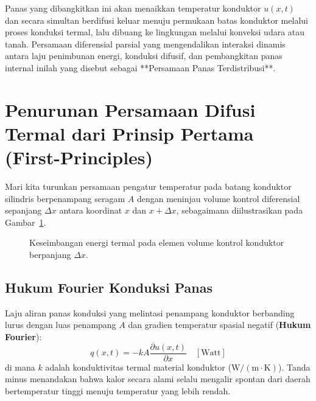 \documentclass[11pt,a4paper]{article}
\theoremstyle{definition}
\begin{document}
Panas yang dibangkitkan ini akan menaikkan temperatur konduktor $u(x, t)$ dan secara simultan berdifusi keluar menuju permukaan batas konduktor melalui proses konduksi termal, lalu dibuang ke lingkungan melalui konveksi udara atau tanah. Persamaan diferensial parsial yang mengendalikan interaksi dinamis antara laju penimbunan energi, konduksi difusif, dan pembangkitan panas internal inilah yang disebut sebagai **Persamaan Panas Terdistribusi**.

\section{Penurunan Persamaan Difusi Termal dari Prinsip Pertama (First-Principles)}

Mari kita turunkan persamaan pengatur temperatur pada batang konduktor silindris berpenampang seragam $A$ dengan meninjau volume kontrol diferensial sepanjang $\Delta x$ antara koordinat $x$ dan $x + \Delta x$, sebagaimana diilustrasikan pada Gambar~\ref{fig:heat_control_volume}.

\begin{figure}[htbp]
\centering
{}
\caption{Keseimbangan energi termal pada elemen volume kontrol konduktor berpanjang $\Delta x$.}
\label{fig:heat_control_volume}
\end{figure}

\subsection{Hukum Fourier Konduksi Panas}
Laju aliran panas konduksi yang melintasi penampang konduktor berbanding lurus dengan luas penampang $A$ dan gradien temperatur spasial negatif (\textbf{Hukum Fourier}):
\begin{equation}
    q(x, t) = -k A \frac{\partial u(x, t)}{\partial x}\quad [\text{Watt}]
    \label{eq:fourier_heat_law}
\end{equation}
di mana $k$ adalah konduktivitas termal material konduktor ($\text{W}/(\text{m}\cdot\text{K})$). Tanda minus menandakan bahwa kalor secara alami selalu mengalir spontan dari daerah bertemperatur tinggi menuju temperatur yang lebih rendah.
\end{document}
